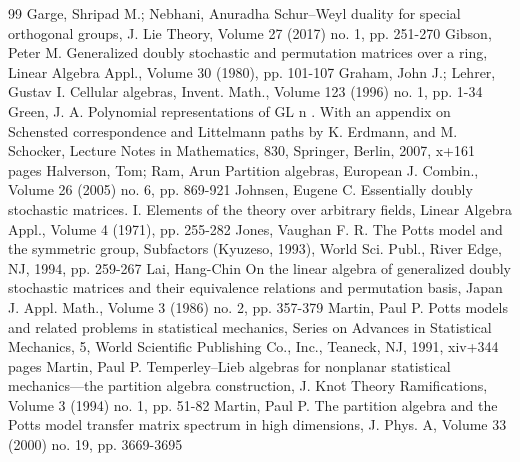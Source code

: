 \documentclass[10pt]{article}
\theoremstyle{definition}
\begin{document}
\begin{thebibliography}{99}
Garge, Shripad M.; Nebhani, Anuradha Schur–Weyl duality for special orthogonal groups, J. Lie Theory, Volume 27 (2017) no. 1, pp. 251-270
Gibson, Peter M. Generalized doubly stochastic and permutation matrices over a ring, Linear Algebra Appl., Volume 30 (1980), pp. 101-107
Graham, John J.; Lehrer, Gustav I. Cellular algebras, Invent. Math., Volume 123 (1996) no. 1, pp. 1-34
Green, J. A. Polynomial representations of GL n . With an appendix on Schensted correspondence and Littelmann paths by K. Erdmann, and M. Schocker, Lecture Notes in Mathematics, 830, Springer, Berlin, 2007, x+161 pages
Halverson, Tom; Ram, Arun Partition algebras, European J. Combin., Volume 26 (2005) no. 6, pp. 869-921
Johnsen, Eugene C. Essentially doubly stochastic matrices. I. Elements of the theory over arbitrary fields, Linear Algebra Appl., Volume 4 (1971), pp. 255-282
Jones, Vaughan F. R. The Potts model and the symmetric group, Subfactors (Kyuzeso, 1993), World Sci. Publ., River Edge, NJ, 1994, pp. 259-267
Lai, Hang-Chin On the linear algebra of generalized doubly stochastic matrices and their equivalence relations and permutation basis, Japan J. Appl. Math., Volume 3 (1986) no. 2, pp. 357-379
Martin, Paul P. Potts models and related problems in statistical mechanics, Series on Advances in Statistical Mechanics, 5, World Scientific Publishing Co., Inc., Teaneck, NJ, 1991, xiv+344 pages
Martin, Paul P. Temperley–Lieb algebras for nonplanar statistical mechanics—the partition algebra construction, J. Knot Theory Ramifications, Volume 3 (1994) no. 1, pp. 51-82
Martin, Paul P. The partition algebra and the Potts model transfer matrix spectrum in high dimensions, J. Phys. A, Volume 33 (2000) no. 19, pp. 3669-3695
\end{thebibliography}
\end{document}
